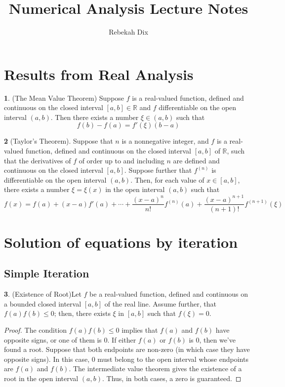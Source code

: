 \documentclass[12pt]{article}
\title{Numerical Analysis Lecture Notes}
\author{Rebekah Dix}
\theoremstyle{definition}
\newcommand{\R}{\mathbb{R}}
\newtheorem{theorem}{\color{ForestGreen}{\textbf{Theorem}}}
\theoremstyle{definition}
\begin{document}
\maketitle
\tableofcontents
\newpage 

\section{Results from Real Analysis}
\begin{theorem}(The Mean Value Theorem)
Suppose $f$ is a real-valued function, defined and continuous on the closed interval $[a,b] \in \R$ and $f$ differentiable on the open interval $(a,b)$. Then there exists a number $\xi \in (a,b)$ such that
\begin{equation}
	f(b) - f(a) = f'(\xi) (b - a)
\end{equation}
\end{theorem}

\begin{theorem}[Taylor's Theorem]
Suppose that $n$ is a nonnegative integer, and $f$ is a real-valued function, defined and continuous on the closed interval $[a,b]$ of $\R$, such that the derivatives of $f$ of order up to and including $n$ are defined and continuous on the closed interval $[a,b]$. Suppose further that $f^{(n)}$ is differentiable on the open interval $(a,b)$. Then, for each value of $x \in [a,b]$, there exists a number $\xi = \xi(x)$ in the open interval $(a,b)$ such that 
\begin{equation}
	f(x) = f(a) + (x-a)f'(a) + \cdots + \frac{(x-a)^n}{n!} f^{(n)}(a) + \frac{(x-a)^{n+1}}{(n+1)!} f^{(n+1)}(\xi)
\end{equation}
\end{theorem}

\section{Solution of equations by iteration}

\subsection{Simple Iteration}
\begin{theorem}(Existence of Root)\label{zeroexists}
Let $f$ be a real-valued function, defined and continuous on a bounded closed interval $[a,b]$ of the real line. Assume further, that $f(a)f(b) \leq 0$; then, there exists $\xi$ in $[a,b]$ such that $f(\xi) = 0$.
\end{theorem}
\begin{proof}
The condition $f(a)f(b) \leq 0$ implies that $f(a)$ and $f(b)$ have opposite signs, or one of them is $0$. If either $f(a)$ or $f(b)$ is $0$, then we've found a root. Suppose that both endpoints are non-zero (in which case they have opposite signs). In this case, $0$ must belong to the open interval whose endpoints are $f(a)$ and $f(b)$. The intermediate value theorem gives the existence of a root in the open interval $(a,b)$. Thus, in both cases, a zero is guaranteed. 
\end{proof}
\end{document}
